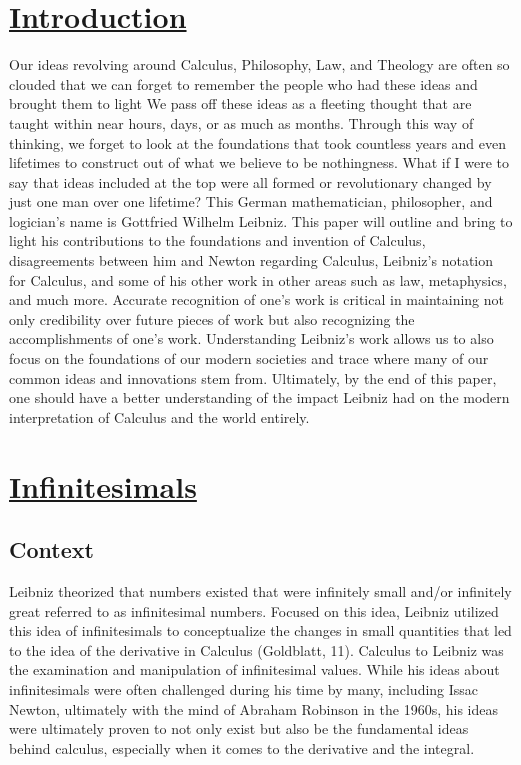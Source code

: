\documentclass[12pt]{article}
\begin{document}
\section*{\underline{Introduction}}
Our ideas revolving around Calculus, Philosophy, Law, and Theology are often so clouded that we can forget to remember the people who had these ideas and brought them to light We pass off these ideas as a fleeting thought that are taught within near hours, days, or as much as months.
Through this way of thinking, we forget to look at the foundations that took countless years and even lifetimes to construct out of what we believe to be nothingness.
What if I were to say that ideas included at the top were all formed or revolutionary changed by just one man over one lifetime?
This German mathematician, philosopher, and logician's name is Gottfried Wilhelm Leibniz.
This paper will outline and bring to light his contributions to the foundations and invention of Calculus, disagreements between him and Newton regarding Calculus, Leibniz's notation for Calculus, and some of his other work in other areas such as law, metaphysics, and much more.
Accurate recognition of one's work is critical in maintaining not only credibility over future pieces of work but also recognizing the accomplishments of one's work.
Understanding Leibniz's work allows us to also focus on the foundations of our modern societies and trace where many of our common ideas and innovations stem from.
Ultimately, by the end of this paper, one should have a better understanding of the impact Leibniz had on the modern interpretation of Calculus and the world entirely.


\section*{\underline{Infinitesimals}}

    \subsection*{Context}
Leibniz theorized that numbers existed that were infinitely small and/or infinitely great referred to as infinitesimal numbers.
Focused on this idea, Leibniz utilized this idea of infinitesimals to conceptualize the changes in small quantities that led to the idea of the derivative in Calculus (Goldblatt, 11).
Calculus to Leibniz was the examination and manipulation of infinitesimal values.
While his ideas about infinitesimals were often challenged during his time by many, including Issac Newton, ultimately with the mind of Abraham Robinson in the 1960s, his ideas were ultimately proven to not only exist but also be the fundamental ideas behind calculus, especially when it comes to the derivative and the integral.
\end{document}
